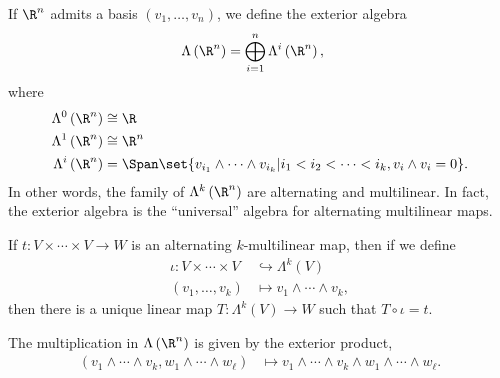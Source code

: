 \documentclass[10pt]{mypackage}
\begin{document}
If $\R^{n}$ admits a basis $\left( v_1,\dots,v_n \right)$, we define the exterior algebra
\begin{align*}
  \Lambda\left( \R^{n} \right) &= \bigoplus_{i=1}^{n} \Lambda^{i}\left( \R^{n} \right),
\end{align*}
where
\begin{align*}
  \Lambda^{0}\left( \R^{n} \right) &\cong \R\\
  \Lambda^{1}\left( \R^{n} \right) &\cong \R^{n}\\
  \Lambda^{i}\left( \R^{n} \right) &= \Span\set{v_{i_1}\wedge\cdots\wedge v_{i_k} | i_1 < i_2 < \cdots < i_k,v_i\wedge v_i = 0}.
\end{align*}
In other words, the family of $\Lambda^{k}\left( \R^{n} \right)$ are alternating and multilinear. In fact, the exterior algebra is the ``universal'' algebra for alternating multilinear maps. 
\begin{theorem}
  If $t\colon V\times\cdots\times V \rightarrow W$ is an alternating $k$-multilinear map, then if we define
  \begin{align*}
    \iota\colon V\times\cdots\times V &\hookrightarrow \Lambda^{k}\left( V \right)\\
    \left( v_1,\dots,v_k \right) &\mapsto v_1\wedge\cdots\wedge v_k,
  \end{align*}
  then there is a unique linear map $T\colon \Lambda^{k}\left( V \right)\rightarrow W$ such that $T\circ\iota = t$. 
  \begin{center}
  \end{center}
\end{theorem}
The multiplication in $\Lambda\left( \R^{n} \right)$ is given by the exterior product,
\begin{align*}
  \left( v_1\wedge\cdots\wedge v_k,w_1\wedge\cdots\wedge w_{\ell} \right) &\mapsto v_1\wedge \cdots\wedge v_k\wedge w_1\wedge\cdots\wedge w_{\ell}.
\end{align*}
\end{document}
